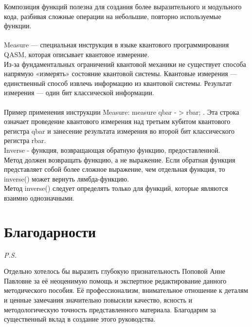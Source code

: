 \documentclass[12pt,a4paper]{article}
\begin{document}
		Композиция функций полезна для создания более выразительного и модульного кода, разбивая сложные операции на небольшие, повторно используемые функции.\\
		\hspace{1em}\\
		Measure — специальная инструкция в языке квантового программирования QASM, которая описывает квантовое измерение.\\
		Из-за фундаментальных ограничений квантовой механики не существует способа напрямую «измерять» состояние квантовой системы. Квантовые измерения — единственный способ извлечь информацию из квантовой системы. Результат измерения — один бит классической информации.\\
		\hspace{1em}\\
		Пример применения инструкции Measure: measure qbar - > rbar; . Эта строка означает проведение квантового измерения над третьим кубитом квантового регистра qbar и занесение результата измерения во второй бит классического регистра rbar.\\
		Inverse - функция, возвращающая обратную функцию, предоставленной.\\
		Метод должен возвращать функцию, а не выражение. Если обратная функция представляет собой более сложное выражение, чем отдельная функция, то inverse() может вернуть лямбда-функцию.\\
		Метод inverse() следует определять только для функций, которые являются взаимно однозначными.
		\newpage 
		\section*{Благодарности} 
		\textit{P.S.}
		
		Отдельно хотелось бы выразить глубокую признательность Поповой Анне Павловне за её неоценимую помощь и экспертное редактирование данного методического пособия. Её профессионализм, внимательное отношение к деталям и ценные замечания значительно повысили качество, ясность и методологическую точность представленного материала. Благодарим за существенный вклад в создание этого руководства.
		
\end{document}
